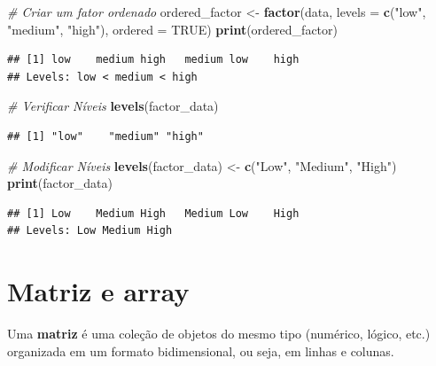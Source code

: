 \documentclass[
]{book}
\newenvironment{Shaded}{\begin{snugshade}}{\end{snugshade}}
\newcommand{\AttributeTok}[1]{\textcolor[rgb]{0.13,0.29,0.53}{#1}}
\newcommand{\CommentTok}[1]{\textcolor[rgb]{0.56,0.35,0.01}{\textit{#1}}}
\newcommand{\ConstantTok}[1]{\textcolor[rgb]{0.56,0.35,0.01}{#1}}
\newcommand{\FunctionTok}[1]{\textcolor[rgb]{0.13,0.29,0.53}{\textbf{#1}}}
\newcommand{\NormalTok}[1]{#1}
\newcommand{\OtherTok}[1]{\textcolor[rgb]{0.56,0.35,0.01}{#1}}
\newcommand{\StringTok}[1]{\textcolor[rgb]{0.31,0.60,0.02}{#1}}
\begin{document}
\begin{Shaded}
\begin{Highlighting}[]
\CommentTok{\# Criar um fator ordenado}
\NormalTok{ordered\_factor }\OtherTok{\textless{}{-}} \FunctionTok{factor}\NormalTok{(data, }\AttributeTok{levels =} \FunctionTok{c}\NormalTok{(}\StringTok{"low"}\NormalTok{, }\StringTok{"medium"}\NormalTok{, }\StringTok{"high"}\NormalTok{), }\AttributeTok{ordered =} \ConstantTok{TRUE}\NormalTok{)}
\FunctionTok{print}\NormalTok{(ordered\_factor)}
\end{Highlighting}
\end{Shaded}

\begin{verbatim}
## [1] low    medium high   medium low    high  
## Levels: low < medium < high
\end{verbatim}

\begin{Shaded}
\begin{Highlighting}[]
\CommentTok{\# Verificar Níveis}
\FunctionTok{levels}\NormalTok{(factor\_data)}
\end{Highlighting}
\end{Shaded}

\begin{verbatim}
## [1] "low"    "medium" "high"
\end{verbatim}

\begin{Shaded}
\begin{Highlighting}[]
\CommentTok{\# Modificar Níveis}
\FunctionTok{levels}\NormalTok{(factor\_data) }\OtherTok{\textless{}{-}} \FunctionTok{c}\NormalTok{(}\StringTok{"Low"}\NormalTok{, }\StringTok{"Medium"}\NormalTok{, }\StringTok{"High"}\NormalTok{)}
\FunctionTok{print}\NormalTok{(factor\_data)}
\end{Highlighting}
\end{Shaded}

\begin{verbatim}
## [1] Low    Medium High   Medium Low    High  
## Levels: Low Medium High
\end{verbatim}

\section{Matriz e array}\label{matriz-e-array}

Uma \textbf{matriz} é uma coleção de objetos do mesmo tipo (numérico, lógico, etc.) organizada em um formato bidimensional, ou seja, em linhas e colunas.
\end{document}
